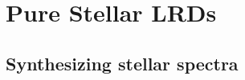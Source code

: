 \section{Pure Stellar LRDs}
\label{sec:pure_stellar}

\subsection{Synthesizing stellar spectra}
\label{sec:stellar_fm}